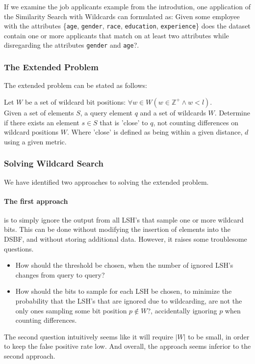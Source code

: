 \documentclass[a4paper,11pt]{article}
\begin{document}
If we examine the job applicants example from the introdution, one application of the Similarity Search with Wildcards can formulated as: Given some employee with the attributes \{\texttt{age}, \texttt{gender}, \texttt{race}, \texttt{education}, \texttt{experience}\} does the dataset contain one or more applicants that match on at least two attributes while disregarding the attributes \texttt{gender} and \texttt{age}?.

\subsubsection*{The Extended Problem}
The extended problem can be stated as follows:

Let $W$ be a set of wildcard bit positions: $\forall w \in W (w \in \mathbb{Z}^+ \land w < l)$.\\
Given a set of elements $S$, a query element $q$ and a set of wildcards $W$. Determine if there exists an element $s \in S$ that is 'close' to $q$, not counting differences on wildcard positions $W$. Where 'close' is defined as being within a given distance, $d$ using a given metric.

\subsubsection*{Solving Wildcard Search}
We have identified two approaches to solving the extended problem.
\paragraph{The first approach} is to simply ignore the output from all LSH's that sample one or more wildcard bits. This can be done without modifying the insertion of elements into the DSBF, and without storing additional data. However, it raises some troublesome questions.

\begin{itemize}
\item How should the threshold be chosen, when the number of ignored LSH's changes from query to query?
\item How should the bits to sample for each LSH be chosen, to minimize the probability that the LSH's that are ignored due to wildcarding, are not the only ones sampling some bit position $p \notin W$?, accidentally ignoring $p$ when counting differences.
\end{itemize}

The second question intuitively seems like it will require $|W|$ to be small, in order to keep the false positive rate low. And overall, the approach seems inferior to the second approach.
\end{document}
